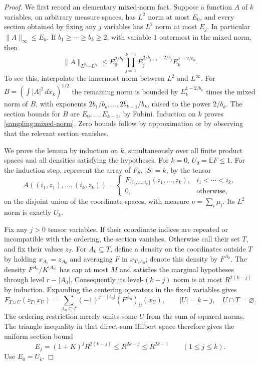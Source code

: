\begin{proof}
We first record an elementary mixed-norm fact. Suppose a function $A$ of $k$
variables, on arbitrary measure spaces, has $L^2$ norm at most $E_0$, and every
section obtained by fixing any $j$ variables has $L^2$ norm at most $E_j$.
In particular $\|A\|_\infty\le E_k$. If
$b_1\ge\cdots\ge b_k\ge2$, with variable $1$ outermost in the mixed norm,
then
\begin{equation}\label{sampling:mixed-norm}
 \|A\|_{L^{b_1}\cdots L^{b_k}}
 \le E_0^{2/b_1}
 \prod_{j=1}^{k-1}E_j^{2/b_{j+1}-2/b_j}
 E_k^{1-2/b_k}.
\end{equation}
To see this, interpolate the innermost norm between $L^2$ and $L^\infty$.
For $B=(\int|A|^2\,dx_k)^{1/2}$ the remaining norm is bounded by
$E_k^{1-2/b_k}$ times the mixed norm of $B$, with exponents
$2b_1/b_k,\ldots,2b_{k-1}/b_k$, raised to the power $2/b_k$.
The section bounds for $B$ are $E_0,\ldots,E_{k-1}$, by Fubini.
Induction on $k$ proves \eqref{sampling:mixed-norm}. Zero bounds follow by
approximation or by observing that the relevant section vanishes.

We prove the lemma by induction on $k$, simultaneously over all finite
product spaces and all densities satisfying the hypotheses. For $k=0$,
$U_0=\mathbb EF\le1$. For the induction step, represent the array of
$F_S$, $|S|=k$, by the tensor
\[
 A((i_1,z_1),\ldots,(i_k,z_k))
 =\begin{cases}
 F_{\{i_1,\ldots,i_k\}}(z_1,\ldots,z_k),&i_1<\cdots<i_k,\\
 0,&\text{otherwise},
 \end{cases}
\]
on the disjoint union of the coordinate spaces, with measure
$\nu=\sum_i\mu_i$. Its $L^2$ norm is exactly $U_k$.

Fix any $j>0$ tensor variables. If their coordinate indices are repeated
or incompatible with the ordering, the section vanishes. Otherwise call
their set $T$, and fix their values $z_T$. For $A_0\subseteq T$, define a
density on the coordinates outside $T$ by holding $x_{A_0}=z_{A_0}$ and
averaging $F$ in $x_{T\setminus A_0}$; denote this density by $F^{A_0}$.
The density $F^{A_0}/K^{|A_0|}$ has cap at most $M$ and satisfies the
marginal hypotheses through level $r-|A_0|$. Consequently its
level-$(k-j)$ norm is at most $R^{2(k-j)}$ by induction. Expanding the
centering operators in the fixed variables gives
\[
 F_{T\cup U}(z_T,x_U)
 =\sum_{A_0\subseteq T}(-1)^{j-|A_0|}(F^{A_0})_U(x_U),
 \qquad |U|=k-j,\quad U\cap T=\varnothing.
\]
The ordering restriction merely omits some $U$ from the sum of squared
norms. The triangle inequality in that direct-sum Hilbert space therefore
gives the uniform section bound
\[
 E_j=(1+K)^j R^{2(k-j)}\le R^{2k-j}\le R^{2k-1}
       \qquad(1\le j\le k).
\]
Use $E_0=U_k$.


\end{proof}
